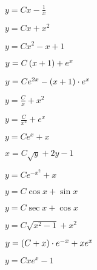 	\label{sol:firstorder:linear}
	\begin{enumsols}

		\item \( y = Cx - \frac{1}{x} \) %
		\item \( y = Cx + x^2 \) %
		\item \( y = Cx^2 - x + 1 \) %
		\item \( y = C \left( x + 1 \right) + e^{x} \) %
		\item \( y = C e^{2x} - \left( x + 1 \right) \cdot e^{x} \) %
		\item \( y = \frac{C}{x} + x^2 \) %
		\item \( y = \frac{C}{x^2} + e^{x} \) %
		\item \( y = C e^{x} + x \) %
		\item \( x = C \sqrt{y} + 2y - 1 \) %
		\item \( y = Ce^{-x^2} + x \) %
		\item \( y = C\cos{x} + \sin{x} \) %
		\item \( y = C \sec{x} + \cos{x} \) %
		\item \( y = C \sqrt{x^2 - 1} + x^2 \) %
		\item \( y = \left( C + x \right) \cdot e^{-x} + xe^{x} \) %
		\item \( y = Cxe^{x} - 1 \) %


\end{enumsols}
